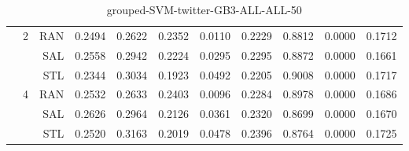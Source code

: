 \begin{center}
\begin{table}[htbp]
\begin{center}
\begin{tabular}{ | r | r | r | r | r | r | r | r | r | r | r |}
 & \multirow{3}{*}{2} & RAN & 0.2494 & 0.2622 & 0.2352 & 0.0110 & 0.2229 & 0.8812 & 0.0000 & 0.1712\\ \cline{3-11}
 &   & SAL & 0.2558 & 0.2942 & 0.2224 & 0.0295 & 0.2295 & 0.8872 & 0.0000 & 0.1661\\ \cline{3-11}
 &   & STL & 0.2344 & 0.3034 & 0.1923 & 0.0492 & 0.2205 & 0.9008 & 0.0000 & 0.1717\\ \cline{2-11}
 & \multirow{3}{*}{4} & RAN & 0.2532 & 0.2633 & 0.2403 & 0.0096 & 0.2284 & 0.8978 & 0.0000 & 0.1686\\ \cline{3-11}
 &   & SAL & 0.2626 & 0.2964 & 0.2126 & 0.0361 & 0.2320 & 0.8699 & 0.0000 & 0.1670\\ \cline{3-11}
 &   & STL & 0.2520 & 0.3163 & 0.2019 & 0.0478 & 0.2396 & 0.8764 & 0.0000 & 0.1725\\ \cline{2-11}
\hline
\end{tabular}
\caption{grouped-SVM-twitter-GB3-ALL-ALL-50}
\end{center}
 \end{table}
\end{center}

